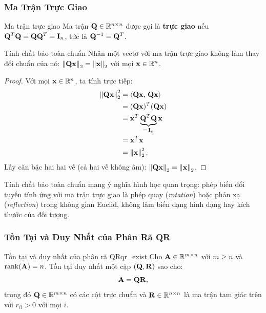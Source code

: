 \subsubsection{Ma Trận Trực Giao}

\begin{mydef}{Ma trận trực giao}{}
Ma trận $\mathbf{Q} \in \mathbb{R}^{n \times n}$ được gọi là \textbf{trực giao} nếu
$\mathbf{Q}^T\mathbf{Q} = \mathbf{Q}\mathbf{Q}^T = \mathbf{I}_n$,
tức là $\mathbf{Q}^{-1} = \mathbf{Q}^T$.
\end{mydef}

\begin{mythm}{Tính chất bảo toàn chuẩn}{}
Nhân một vectơ với ma trận trực giao không làm thay đổi chuẩn của nó:
$\left\lVert\mathbf{Q}\mathbf{x}\right\rVert_2 = \left\lVert\mathbf{x}\right\rVert_2$ với mọi $\mathbf{x} \in \mathbb{R}^n$.
\end{mythm}

\begin{proof}
Với mọi $\mathbf{x} \in \mathbb{R}^n$, ta tính trực tiếp:
\begin{align*}
    \left\lVert\mathbf{Q}\mathbf{x}\right\rVert_2^2
    &= \langle \mathbf{Q}\mathbf{x},\, \mathbf{Q}\mathbf{x} \rangle \\
    &= (\mathbf{Q}\mathbf{x})^T(\mathbf{Q}\mathbf{x}) \\
    &= \mathbf{x}^T \underbrace{\mathbf{Q}^T\mathbf{Q}}_{=\,\mathbf{I}_n} \mathbf{x} \\
    &= \mathbf{x}^T\mathbf{x} \\
    &= \left\lVert\mathbf{x}\right\rVert_2^2.
\end{align*}
Lấy căn bậc hai hai vế (cả hai vế không âm): $\left\lVert\mathbf{Q}\mathbf{x}\right\rVert_2 = \left\lVert\mathbf{x}\right\rVert_2$.
\end{proof}

Tính chất bảo toàn chuẩn mang ý nghĩa hình học quan trọng: phép biến đổi tuyến tính
ứng với ma trận trực giao là phép quay (\textit{rotation}) hoặc phản xạ
(\textit{reflection}) trong không gian Euclid, không làm biến dạng hình dạng hay kích
thước của đối tượng.


\subsubsection{Tồn Tại và Duy Nhất của Phân Rã QR}

\begin{mythm}{Tồn tại và duy nhất của phân rã QR}{qr_exist}
Cho $\mathbf{A} \in \mathbb{R}^{m \times n}$ với $m \geq n$ và $\operatorname{rank}(\mathbf{A}) = n$.
Tồn tại duy nhất một cặp $(\mathbf{Q}, \mathbf{R})$ sao cho:
\[
    \mathbf{A} = \mathbf{Q}\mathbf{R},
\]
trong đó $\mathbf{Q} \in \mathbb{R}^{m \times n}$ có các cột trực chuẩn và $\mathbf{R} \in \mathbb{R}^{n \times n}$
là ma trận tam giác trên với $r_{ii} > 0$ với mọi $i$.
\end{mythm}

